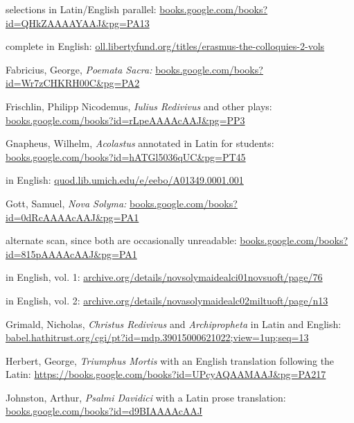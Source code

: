 \documentclass[20pt, twoside]{extarticle}
\begin{document}
\begin{singlespace}
\begin{en}
\hi\dashes selections in Latin/English parallel: \url{books.google.com/books?id=QHkZAAAAYAAJ&pg=PA13}

\hi\dashes complete in English: \url{oll.libertyfund.org/titles/erasmus-the-colloquies-2-vols}




\hi Fabricius, George, \emph{Poemata Sacra:} \url{books.google.com/books?id=Wr7zCHKRH00C&pg=PA2}

\hi Frischlin, Philipp Nicodemus, \emph{Iulius Redivivus} and other plays: \url{books.google.com/books?id=rLpeAAAAcAAJ&pg=PP3}


\hi Gnapheus, Wilhelm, \emph{Acolastus} annotated in Latin for students: \url{books.google.com/books?id=hATGl5036qUC&pg=PT45}

\hi\dashes in English: \url{quod.lib.umich.edu/e/eebo/A01349.0001.001}

\hi Gott, Samuel, \emph{Nova Solyma:} \url{books.google.com/books?id=0dRcAAAAcAAJ&pg=PA1}

\hi\dashes alternate scan, since both are occasionally unreadable: \url{books.google.com/books?id=815pAAAAcAAJ&pg=PA1}

\hi\dashes in English, vol. 1: \url{archive.org/details/novsolymaidealci01novsuoft/page/76}

\hi\dashes in English, vol. 2: \url{archive.org/details/novasolymaidealc02miltuoft/page/n13}

\hi Grimald, Nicholas, \emph{Christus Redivivus} and \emph{Archipropheta} in Latin and English: \url{babel.hathitrust.org/cgi/pt?id=mdp.39015000621022;view=1up;seq=13}

\hi Herbert, George, \emph{Triumphus Mortis} with an English translation following the Latin: \url{https://books.google.com/books?id=UPcyAQAAMAAJ&pg=PA217}

\hi Johnston, Arthur, \emph{Psalmi Davidici} with a Latin prose translation: \href{https://books.google.com/books?id=d9BIAAAAcAAJ&pg=PA1}{books.google.com/books?id=d9BIAAAAcAAJ}


\end{en}
\end{singlespace}
\end{document}
